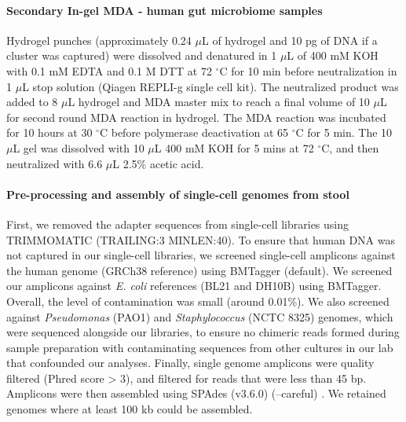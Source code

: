 \paragraph{Secondary In-gel MDA - human gut microbiome samples}
Hydrogel punches (approximately 0.24 $\mu$L of hydrogel and 10 pg of DNA if a cluster was captured) were dissolved and denatured in 1 $\mu$L of 400 mM KOH with 0.1 mM EDTA and 0.1 M DTT at 72 $^{\circ}$C for 10 min before neutralization in 1 $\mu$L stop solution (Qiagen REPLI-g single cell kit). The neutralized product was added to 8 $\mu$L hydrogel and MDA master mix to reach a final volume of 10 $\mu$L for second round MDA reaction in hydrogel. The MDA reaction was incubated for 10 hours at 30 $^{\circ}$C before polymerase deactivation at 65 $^{\circ}$C for 5 min. The 10 $\mu$L gel was dissolved with 10 $\mu$L 400 mM KOH for 5 mins at 72 $^{\circ}$C, and then neutralized with 6.6 $\mu$L 2.5\% acetic acid.

\paragraph{Pre-processing and assembly of single-cell genomes from stool}
First, we removed the adapter sequences from single-cell libraries using TRIMMOMATIC \cite{Bolger:2014ek} (TRAILING:3 MINLEN:40). To ensure that human DNA was not captured in our single-cell libraries, we screened single-cell amplicons against the human genome (GRCh38 reference) using BMTagger \cite{Rotmistrovsky:CVigB6Il} (default). We screened our amplicons against \textit{E. coli} references (BL21 and DH10B) using BMTagger. Overall, the level of contamination was small (around 0.01\%). We also screened against \textit{Pseudomonas} (PAO1) and \textit{Staphylococcus} (NCTC 8325) genomes, which were sequenced alongside our libraries, to ensure no chimeric reads formed during sample preparation with contaminating sequences from other cultures in our lab that confounded our analyses. Finally, single genome amplicons were quality filtered (Phred score > 3), and filtered for reads that were less than 45 bp. Amplicons were then assembled using SPAdes (v3.6.0) (--careful) \cite{Bankevich:2012ih}. We retained genomes where at least 100 kb could be assembled.

